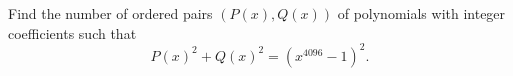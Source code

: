 Find the number of ordered pairs $(P(x),Q(x))$ of polynomials with integer coefficients such that
\[
P(x)^2+Q(x)^2=\left(x^{4096}-1\right)^2.
\]
